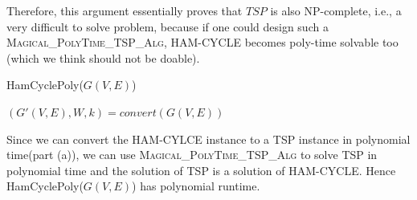 \documentclass[11pt]{article}
\begin{document}
\begin{enumerate}
\begin{itemize}
\end{itemize}

Therefore, this argument essentially proves that $TSP$ is also NP-complete, i.e., a very difficult to solve problem, because if one could design such a \textsc{Magical\_PolyTime\_TSP\_Alg}, HAM-CYCLE becomes poly-time solvable too (which we think should not be doable).

\begin{algorithm}[h]
    \caption{HamCyclePoly($G(V, E)$)}
    $(G'(V, E), W, k) = convert(G(V, E))$\\
\end{algorithm}
Since we can convert the HAM-CYLCE instance to a TSP instance in polynomial time(part (a)), we can use 
\textsc{Magical\_PolyTime\_TSP\_Alg} to solve TSP in polynomial time and the solution of TSP is a solution of 
HAM-CYCLE. Hence HamCyclePoly($G(V, E)$) has polynomial runtime. 


\end{enumerate}
\end{document}
